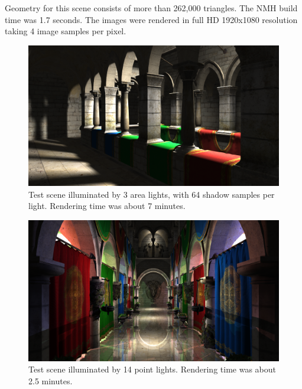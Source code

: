 Geometry for this scene consists of more than 262,000 triangles. The NMH build time was 1.7 seconds. The images were rendered in full HD 1920x1080 resolution taking 4 image samples per pixel.

\vspace{1.5cm}
\begin{figure}[htb]
  \begin{center}
    \includegraphics[width=\textwidth]{chapters/results/sponza_softshadows.png}
  \end{center}
  \caption{Test scene illuminated by 3 area lights, with 64 shadow samples per light. Rendering time was about 7 minutes.}
\end{figure}

\begin{figure}[htb]
  \begin{center}
    \includegraphics[width=\textwidth]{chapters/results/sponza_manypoint.png}
  \end{center}
  \caption{Test scene illuminated by 14 point lights. Rendering time was about 2.5 minutes.}
\end{figure}

